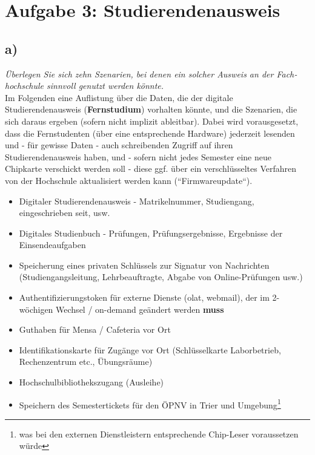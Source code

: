 \chapter{Aufgabe 3:  Studierendenausweis}

\section{a)}

\textit{Überlegen Sie sich zehn Szenarien, bei denen ein solcher Ausweis an der Fach‐
hochschule sinnvoll genutzt werden könnte.}\\

\vspace{5mm}
\noindent
Im Folgenden eine Auflistung über die Daten, die der digitale Studierendenausweis (\textbf{Fernstudium}) vorhalten könnte, und die Szenarien, die sich daraus ergeben (sofern nicht implizit ableitbar).
Dabei wird vorausgesetzt, dass die Fernstudenten (über eine entsprechende Hardware) jederzeit lesenden und - für gewisse Daten - auch schreibenden Zugriff auf ihren Studierendenausweis haben, und - sofern nicht jedes Semester eine neue Chipkarte verschickt werden soll - diese ggf. über ein verschlüsseltes Verfahren von der Hochschule aktualisiert werden kann (``Firmwareupdate``).\\

\begin{itemize}
    \itemsep0.5em
    \item Digitaler Studierendenausweis - Matrikelnummer, Studiengang, eingeschrieben seit, usw.
    \item Digitales Studienbuch - Prüfungen, Prüfungsergebnisse, Ergebnisse der Einsendeaufgaben
    \item Speicherung eines privaten Schlüssels zur Signatur von Nachrichten (Studiengangsleitung, Lehrbeauftragte, Abgabe von Online-Prüfungen usw.)
    \item Authentifizierungstoken für externe Dienste (olat, webmail), der im 2-wöchigen Wechsel / on-demand geändert werden \textbf{muss}
    \item Guthaben für Mensa / Cafeteria vor Ort
    \item Identifikationskarte für Zugänge vor Ort (Schlüsselkarte Laborbetrieb, Rechenzentrum etc., Übungsräume)
    \item Hochschulbibliothekszugang (Ausleihe)
    \item Speichern des Semestertickets für den ÖPNV in Trier und Umgebung\footnote{was bei den externen Dienstleistern entsprechende Chip-Leser voraussetzen würde}
\end{itemize}

